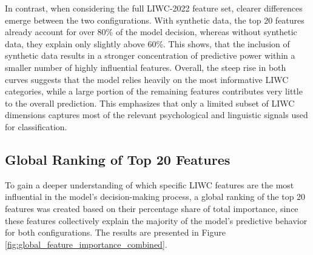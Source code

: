 In contrast, when considering the full LIWC-2022 feature set, clearer differences emerge between the two configurations. With synthetic data, the top 20 features already account for over 80\% of the model decision, whereas without synthetic data, they explain only slightly above 60\%. This shows, that the inclusion of synthetic data results in a stronger concentration of predictive power within a smaller number of highly influential features. Overall, the steep rise in both curves suggests that the model relies heavily on the most informative LIWC categories, while a large portion of the remaining features contributes very little to the overall prediction. This emphasizes that only a limited subset of LIWC dimensions captures most of the relevant psychological and linguistic signals used for classification. 

\subsection{Global Ranking of Top 20 Features}\label{sec:global_ranking_top20}
To gain a deeper understanding of which specific LIWC features are the most influential in the model's decision-making process, a global ranking of the top 20 features was created based on their percentage share of total importance, since these features collectively explain the majority of the model’s predictive behavior for both configurations. The results are presented in Figure \ref{fig:global_feature_importance_combined}.

